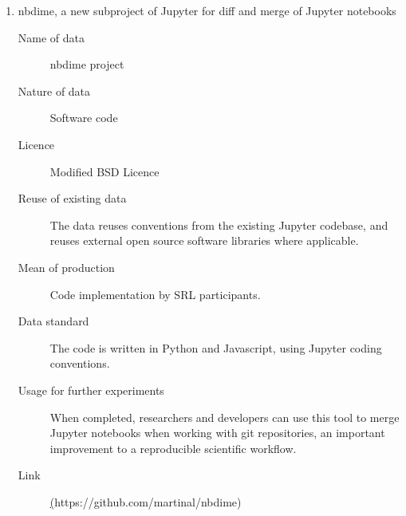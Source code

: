 \documentclass[12pt]{article}
\begin{document}
\begin{enumerate}

  \item nbdime, a new subproject of Jupyter for diff and merge of Jupyter notebooks
    \begin{description}
    \item[Name of data] nbdime project
    \item[Nature of data] Software code
    \item[Licence] Modified BSD Licence
    \item[Reuse of existing data] The data reuses conventions from the
      existing Jupyter codebase, and reuses external open source
      software libraries where applicable.
    \item[Mean of production] Code implementation by SRL participants.
    \item[Data standard] The code is written in Python and Javascript, using Jupyter coding conventions.
    \item [Usage for further experiments] When completed, researchers
      and developers can use this tool to merge Jupyter notebooks
      when working with git repositories, an important improvement to
      a reproducible scientific workflow.
    \item [Link] \href{https://github.com/martinal/nbdime}(https://github.com/martinal/nbdime)
    \end{description}

\end{enumerate}
  
\end{document}
